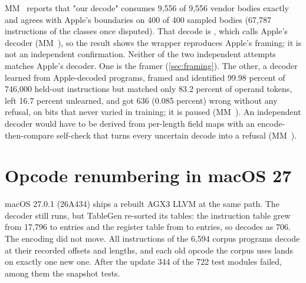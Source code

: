 MM~ reports that "our decode" consumes 9,556 of 9,556 vendor bodies exactly and
agrees with Apple's boundaries on 400 of 400 sampled bodies (67,787 instructions of the classes once disputed). That
decode is , which calls Apple's decoder (MM~), so the result shows the wrapper reproduces
Apple's framing; it is not an independent confirmation. Neither of the two independent attempts matches Apple's decoder. One is the framer
(\cref{sec:framing}). The other, a decoder learned from Apple-decoded programs, framed and identified 99.98 percent of 746,000
held-out instructions but matched only 83.2 percent of operand tokens, left 16.7 percent unlearned, and got 636 (0.085
percent) wrong without any refusal, on bits that never varied in training; it is paused (MM~). An independent
decoder would have to be derived from per-length field maps with an encode-then-compare self-check that turns every uncertain decode into a
refusal (MM~).

\section{Opcode renumbering in macOS 27}\label{sec:decoder-renumbering}

macOS 27.0.1 (26A434) ships a rebuilt AGX3 LLVM at the same path. The decoder still runs, but TableGen re-sorted its
tables: the instruction table grew from 17,796 to  entries and the register table from  to  entries,
so  decodes as 706. The encoding did not move. All  instructions of the 6,594 corpus
programs decode at their recorded offsets and lengths, and each old opcode the corpus uses lands on exactly one new one.
After the update 344 of the 722 test modules failed, among them the snapshot tests.

